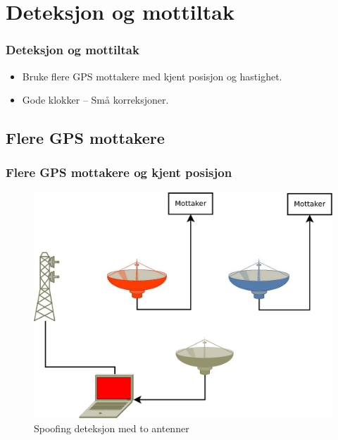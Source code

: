 \documentclass[xcolor=table]{beamer}
\begin{document}
\section{Deteksjon og mottiltak}
\begin{frame}
\frametitle{Deteksjon og mottiltak}
  \begin{itemize}
      \item Bruke flere GPS mottakere med kjent posisjon og hastighet.
      \item Gode klokker -- Små korreksjoner.
    \end{itemize}
\end{frame}

\subsection{Flere GPS mottakere}
\begin{frame} 
  \frametitle{Flere GPS mottakere og kjent posisjon}
  \begin{figure}
    \includegraphics[scale=0.2]{thesis/graphics/toantenner.pdf}
    \caption{Spoofing deteksjon med to antenner}
  \end{figure}
\end{frame}
\end{document}
